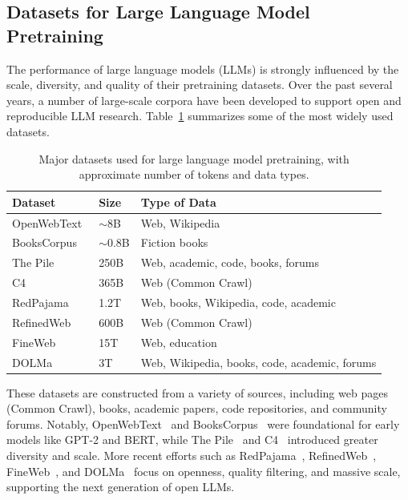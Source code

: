 \subsection{Datasets for Large Language Model Pretraining}
The performance of large language models (LLMs) is strongly influenced by the scale, diversity, and quality of their pretraining datasets. Over the past several years, a number of large-scale corpora have been developed to support open and reproducible LLM research. Table~\ref{tab:llm-datasets} summarizes some of the most widely used datasets.
\begin{table}[h]
\centering
\begin{tabular}{p{3.5cm} p{1.5cm} p{8.5cm}}
\toprule
\textbf{Dataset} & \textbf{Size} & \textbf{Type of Data} \\
\midrule
OpenWebText~\citep{gokaslan2019openweb} & $\sim$8B & Web, Wikipedia \\
BooksCorpus~\citep{zhu2015aligning} & $\sim$0.8B & Fiction books \\
The Pile~\citep{gao2020pile} & 250B & Web, academic, code, books, forums \\
C4~\citep{raffel2020t5} & 365B & Web (Common Crawl) \\
RedPajama~\citep{together2023redpajama} & 1.2T & Web, books, Wikipedia, code, academic \\
RefinedWeb~\citep{penedo2023refinedweb} & 600B & Web (Common Crawl) \\
FineWeb~\citep{penedo2024fineweb} & 15T & Web, education \\
DOLMa~\citep{soldaini2024dolma} & 3T & Web, Wikipedia, books, code, academic, forums \\
\bottomrule
\end{tabular}
\caption{Major datasets used for large language model pretraining, with approximate number of tokens and data types.}
\label{tab:llm-datasets}
\end{table}
These datasets are constructed from a variety of sources, including web pages (Common Crawl), books, academic papers, code repositories, and community forums. Notably, OpenWebText~\citep{gokaslan2019openweb} and BooksCorpus~\citep{zhu2015aligning} were foundational for early models like GPT-2 and BERT, while The Pile~\citep{gao2020pile} and C4~\citep{raffel2020t5} introduced greater diversity and scale. More recent efforts such as RedPajama~\citep{together2023redpajama}, RefinedWeb~\citep{penedo2023refinedweb}, FineWeb~\citep{penedo2024fineweb}, and DOLMa~\citep{soldaini2024dolma} focus on openness, quality filtering, and massive scale, supporting the next generation of open LLMs.

